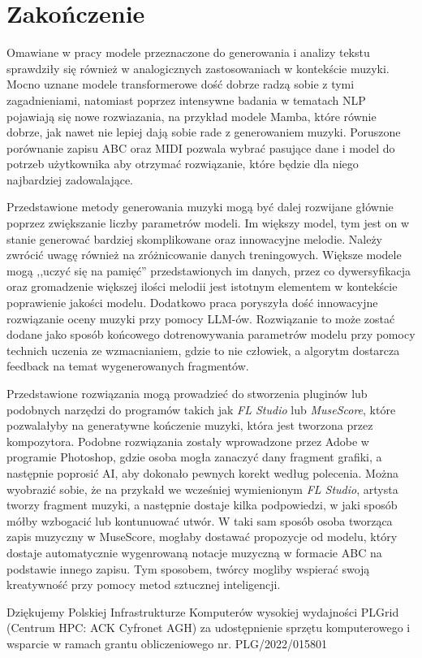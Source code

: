 \documentclass[data-science]{agh-wi} %
\begin{document}
\chapter{Zakończenie}

Omawiane w pracy modele przeznaczone do generowania i analizy tekstu sprawdziły się również w analogicznych zastosowaniach w kontekście muzyki. Mocno uznane modele transformerowe dość dobrze radzą sobie z tymi zagadnieniami, natomiast poprzez intensywne badania w tematach NLP pojawiają się nowe rozwiazania, na przykład modele Mamba, które równie dobrze, jak nawet nie lepiej dają sobie rade z generowaniem muzyki. Poruszone porównanie zapisu ABC oraz MIDI pozwala wybrać pasujące dane i model do potrzeb użytkownika aby otrzymać rozwiązanie, które będzie dla niego najbardziej zadowalające.

Przedstawione metody generowania muzyki mogą być dalej rozwijane głównie poprzez zwiększanie liczby parametrów modeli. Im większy model, tym jest on w stanie generować bardziej skomplikowane oraz innowacyjne melodie. Należy zwrócić uwagę również na zróżnicowanie danych treningowych. Większe modele mogą ,,uczyć się na pamięć'' przedstawionych im danych, przez co dywersyfikacja oraz gromadzenie większej ilości melodii jest istotnym elementem w kontekście poprawienie jakości modelu. Dodatkowo praca poryszyła dość innowacyjne rozwiązanie oceny muzyki przy pomocy LLM-ów. Rozwiązanie to może zostać dodane jako sposób końcowego dotrenowywania parametrów modelu przy pomocy technich uczenia ze wzmacnianiem, gdzie to nie człowiek, a algorytm dostarcza feedback na temat wygenerowanych fragmentów.

Przedstawione rozwiązania mogą prowadzieć do stworzenia pluginów lub podobnych narzędzi do programów takich jak \textit{FL Studio} lub \textit{MuseScore}, które pozwalałyby na generatywne kończenie muzyki, która jest tworzona przez kompozytora. Podobne rozwiązania zostały wprowadzone przez Adobe w programie Photoshop, gdzie osoba mogła zanaczyć dany fragment grafiki, a następnie poprosić AI, aby dokonało pewnych korekt według polecenia. Można wyobrazić sobie, że na przykałd we wcześniej wymienionym \textit{FL Studio}, artysta tworzy fragment muzyki, a następnie dostaje kilka podpowiedzi, w jaki sposób mółby wzbogacić lub kontunuować utwór. W taki sam sposób osoba tworząca zapis muzyczny w MuseScore, mogłaby dostawać propozycje od modelu, który dostaje automatycznie wygenrowaną notacje muzyczną w formacie ABC na podstawie innego zapisu. Tym sposobem, twórcy mogliby wspierać swoją kreatywność przy pomocy metod sztucznej inteligencji.

\cleardoublepage
\thispagestyle{empty}
\vspace*{\fill}
\begin{flushright}
    \em
    \begin{minipage}{0.75\textwidth}
        Dziękujemy Polskiej Infrastrukturze Komputerów wysokiej wydajności PLGrid (Centrum HPC: ACK Cyfronet AGH) za udostępnienie sprzętu komputerowego i wsparcie w ramach grantu obliczeniowego nr. PLG/2022/015801
    \end{minipage}
\end{flushright}

\printbibliography
\end{document}

